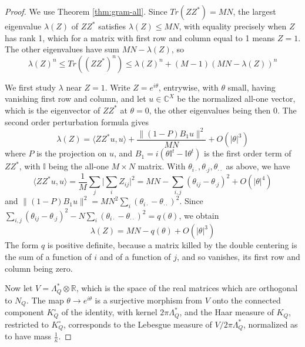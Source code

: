 \documentclass[11pt,reqno]{amsart}
\theoremstyle{definition}
\numberwithin{equation}{section}
\begin{document}
\begin{proof}
We use Theorem \ref{thm:gram-all}. Since $Tr(ZZ^*)=MN$, the largest eigenvalue $\lambda(Z)$ of $ZZ^*$ satisfies $\lambda(Z)\leq MN$, with equality precisely when $Z$ has rank 1, which for a matrix with first row and column equal to 1 means $Z=1$. The other eigenvalues have sum $MN-\lambda(Z)$, so
\begin{equation}\label{eq:growth-trace}
\lambda(Z)^n\leq Tr((ZZ^*)^n)\leq\lambda(Z)^n+(M-1)(MN-\lambda(Z))^n
\end{equation}

We first study $\lambda$ near $Z=1$. Write $Z=e^{i\theta}$, entrywise, with $\theta$ small, having vanishing first row and column, and let $u\in\mathbb C^X$ be the normalized all-one vector, which is the eigenvector of $ZZ^*$ at $\theta=0$, the other eigenvalues being then 0. The second order perturbation formula gives
$$\lambda(Z)=\langle ZZ^*u,u\rangle+\frac{\|(1-P)B_1u\|^2}{MN}+O(|\theta|^3)$$
where $P$ is the projection on $u$, and $B_1=i(\theta\mathbb I^t-\mathbb I\theta^t)$ is the first order term of $ZZ^*$, with $\mathbb I$ being the all-one $M\times N$ matrix. With $\theta_{i\cdot},\theta_{\cdot j},\theta_{\cdot\cdot}$ as above, we have
$$\langle ZZ^*u,u\rangle=\frac1M\sum_j\Big|\sum_iZ_{ij}\Big|^2=MN-\sum_{i,j}(\theta_{ij}-\theta_{\cdot j})^2+O(|\theta|^4)$$
and $\|(1-P)B_1u\|^2=MN^2\sum_i(\theta_{i\cdot}-\theta_{\cdot\cdot})^2$. Since $\sum_{i,j}(\theta_{ij}-\theta_{\cdot j})^2-N\sum_i(\theta_{i\cdot}-\theta_{\cdot\cdot})^2=q(\theta)$, we obtain
$$\lambda(Z)=MN-q(\theta)+O(|\theta|^3)$$
The form $q$ is positive definite, because a matrix killed by the double centering is the sum of a function of $i$ and of a function of $j$, and so vanishes, its first row and column being zero.

Now let $V=\Lambda_Q^*\otimes\mathbb R$, which is the space of the real matrices which are orthogonal to $N_Q$. The map $\theta\to e^{i\theta}$ is a surjective morphism from $V$ onto the connected component $K_Q^\circ$ of the identity, with kernel $2\pi\Lambda_Q^*$, and the Haar measure of $K_Q$, restricted to $K_Q^\circ$, corresponds to the Lebesgue measure of $V/2\pi\Lambda_Q^*$, normalized as to have mass $\frac1\kappa$.


\end{proof}
\end{document}
